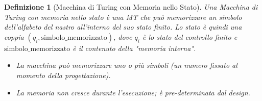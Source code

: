 \documentclass[a4paper]{article}
\newtheorem{definition}{Definizione}
\begin{document}
\begin{definition}[Macchina di Turing con Memoria nello Stato]
Una Macchina di Turing con memoria nello stato è una MT che può memorizzare un simbolo dell'alfabeto del nastro all'interno del suo stato finito. Lo stato è quindi una coppia $(q_i, \text{simbolo\_memorizzato})$, dove $q_i$ è lo stato del controllo finito e $\text{simbolo\_memorizzato}$ è il contenuto della "memoria interna".
\begin{itemize}
    \item La macchina può memorizzare uno o più simboli (un numero fissato al momento della progettazione).
    \item La memoria non cresce durante l'esecuzione; è pre-determinata dal design.
\end{itemize}
\end{definition}
\end{document}
